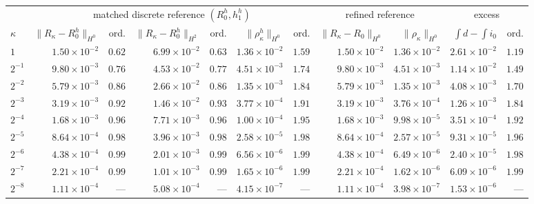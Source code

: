 \begin{tabular}{@{}l@{\;\;}rrrrrr@{\quad}rr@{\quad}rr@{}}
\toprule
 & \multicolumn{6}{c}{matched discrete reference $(R_0^h,h_1^h)$} & \multicolumn{2}{c}{refined reference} & \multicolumn{2}{c}{excess}\\
\cmidrule(lr){2-7}\cmidrule(lr){8-9}\cmidrule(lr){10-11}
$\kappa$ & $\|R_\kappa-R_0^h\|_{H^0}$ & ord. & $\|R_\kappa-R_0^h\|_{H^2}$ & ord. & $\|\rho_\kappa^h\|_{H^0}$ & ord. & $\|R_\kappa-R_0\|_{H^0}$ & $\|\rho_\kappa\|_{H^0}$ & $\int d-\int i_0$ & ord.\\
\midrule
$1$ & $1.50\times10^{-2}$ & $0.62$ & $6.99\times10^{-2}$ & $0.63$ & $1.36\times10^{-2}$ & $1.59$ & $1.50\times10^{-2}$ & $1.36\times10^{-2}$ & $2.61\times10^{-2}$ & $1.19$\\
$2^{-1}$ & $9.80\times10^{-3}$ & $0.76$ & $4.53\times10^{-2}$ & $0.77$ & $4.51\times10^{-3}$ & $1.74$ & $9.80\times10^{-3}$ & $4.51\times10^{-3}$ & $1.14\times10^{-2}$ & $1.49$\\
$2^{-2}$ & $5.79\times10^{-3}$ & $0.86$ & $2.66\times10^{-2}$ & $0.86$ & $1.35\times10^{-3}$ & $1.84$ & $5.79\times10^{-3}$ & $1.35\times10^{-3}$ & $4.08\times10^{-3}$ & $1.70$\\
$2^{-3}$ & $3.19\times10^{-3}$ & $0.92$ & $1.46\times10^{-2}$ & $0.93$ & $3.77\times10^{-4}$ & $1.91$ & $3.19\times10^{-3}$ & $3.76\times10^{-4}$ & $1.26\times10^{-3}$ & $1.84$\\
$2^{-4}$ & $1.68\times10^{-3}$ & $0.96$ & $7.71\times10^{-3}$ & $0.96$ & $1.00\times10^{-4}$ & $1.95$ & $1.68\times10^{-3}$ & $9.98\times10^{-5}$ & $3.51\times10^{-4}$ & $1.92$\\
$2^{-5}$ & $8.64\times10^{-4}$ & $0.98$ & $3.96\times10^{-3}$ & $0.98$ & $2.58\times10^{-5}$ & $1.98$ & $8.64\times10^{-4}$ & $2.57\times10^{-5}$ & $9.31\times10^{-5}$ & $1.96$\\
$2^{-6}$ & $4.38\times10^{-4}$ & $0.99$ & $2.01\times10^{-3}$ & $0.99$ & $6.56\times10^{-6}$ & $1.99$ & $4.38\times10^{-4}$ & $6.49\times10^{-6}$ & $2.40\times10^{-5}$ & $1.98$\\
$2^{-7}$ & $2.21\times10^{-4}$ & $0.99$ & $1.01\times10^{-3}$ & $0.99$ & $1.65\times10^{-6}$ & $1.99$ & $2.21\times10^{-4}$ & $1.62\times10^{-6}$ & $6.09\times10^{-6}$ & $1.99$\\
$2^{-8}$ & $1.11\times10^{-4}$ & --- & $5.08\times10^{-4}$ & --- & $4.15\times10^{-7}$ & --- & $1.11\times10^{-4}$ & $3.98\times10^{-7}$ & $1.53\times10^{-6}$ & ---\\
\bottomrule
\end{tabular}
